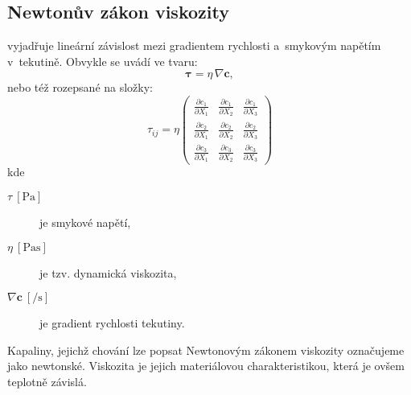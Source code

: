 
\subsection{Newtonův zákon viskozity}
vyjadřuje lineární závislost mezi gradientem rychlosti a~smykovým napětím v~tekutině.
Obvykle se uvádí ve tvaru:
\begin{equation}
	\bm{\tau} = \eta\, \nabla \bm{c},
\end{equation}
nebo též rozepsané na složky:
\begin{equation}
	\tau_{ij} = \eta \left(\begin{matrix}
		\frac{\partial c_1}{\partial X_1} & \frac{\partial c_1}{\partial X_2} & \frac{\partial c_1}{\partial X_3}\\
		\frac{\partial c_2}{\partial X_1} & \frac{\partial c_2}{\partial X_2} & \frac{\partial c_2}{\partial X_3}\\
		\frac{\partial c_3}{\partial X_1} & \frac{\partial c_3}{\partial X_2} & \frac{\partial c_3}{\partial X_3}
	\end{matrix}\right)
\end{equation}
kde
\begin{description}
	\item[{$\tau\:[\si{\pascal}]$}] je smykové napětí,
	\item[{$\eta\:[\si{\pascal\second}]$}] je tzv. dynamická viskozita,
	\item[{$\nabla \bm{c}\:[\si{\per\second}]$}] je gradient rychlosti tekutiny.
\end{description}

Kapaliny, jejichž chování lze popsat Newtonovým zákonem viskozity označujeme jako newtonské.
Viskozita je jejich materiálovou charakteristikou, která je ovšem teplotně závislá.
